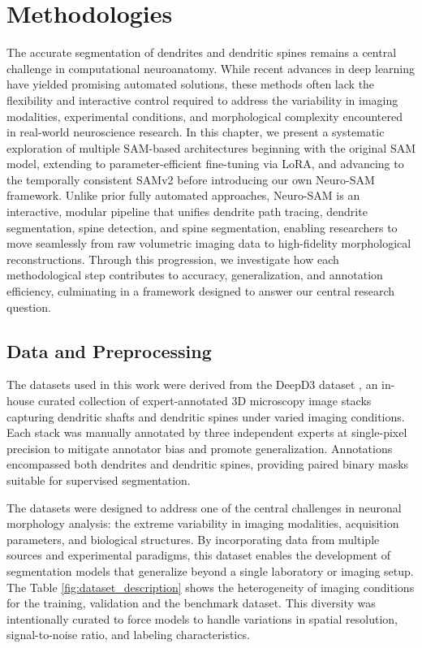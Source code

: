\chapter{Methodologies}

The accurate segmentation of dendrites and dendritic spines remains a central challenge in computational neuroanatomy. While recent advances in deep learning have yielded promising automated solutions, these methods often lack the flexibility and interactive control required to address the variability in imaging modalities, experimental conditions, and morphological complexity encountered in real-world neuroscience research. In this chapter, we present a systematic exploration of multiple \gls{SAM}-based architectures beginning with the original \gls{SAM} model, extending to parameter-efficient fine-tuning via \gls{LoRA}, and advancing to the temporally consistent \gls{SAMv2} before introducing our own Neuro-\gls{SAM} framework. Unlike prior fully automated approaches, Neuro-\gls{SAM} is an interactive, modular pipeline that unifies dendrite path tracing, dendrite segmentation, spine detection, and spine segmentation, enabling researchers to move seamlessly from raw volumetric imaging data to high-fidelity morphological reconstructions. Through this progression, we investigate how each methodological step contributes to accuracy, generalization, and annotation efficiency, culminating in a framework designed to answer our central research question.

\section{Data and Preprocessing}
The datasets used in this work were derived from the \gls{DeepD3} dataset \cite{Fernholz_2024}, an in-house curated collection of expert-annotated 3D microscopy image stacks capturing dendritic shafts and dendritic spines under varied imaging conditions. Each stack was manually annotated by three independent experts at single-pixel precision to mitigate annotator bias and promote generalization. Annotations encompassed both dendrites and dendritic spines, providing paired binary masks suitable for supervised segmentation. 

The datasets were designed to address one of the central challenges in neuronal morphology analysis: the extreme variability in imaging modalities, acquisition parameters, and biological structures. By incorporating data from multiple sources and experimental paradigms, this dataset enables the development of segmentation models that generalize beyond a single laboratory or imaging setup. The Table \ref{fig:dataset_description} shows the heterogeneity of imaging conditions for the training, validation and the benchmark dataset. This diversity was intentionally curated to force models to handle variations in spatial resolution, signal-to-noise ratio, and labeling characteristics.

